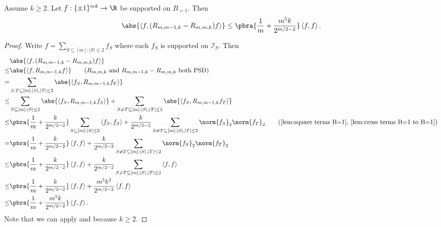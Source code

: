 \begin{corollary}\label{cor:f1-f1}
    Assume $k\geq 2$. Let $f:\{\pm1\}^{mk}\to\R$ be supported on $B_{=1}$. Then 
    \begin{align*}
        \abs{\left\langle f,(R_{m,m-1,k}-R_{m,m,k})f\right\rangle }\leq \pbra{\frac1m+\frac{m^5k}{2^{m/2-2}}}\left\langle f,f\right\rangle.
    \end{align*}
\end{corollary}
\begin{proof}
    Write $f=\sum_{S\subseteq[m]:|S|\leq 2}f_{S}$ where each $f_S$ is supported on $\mathcal{I}_S$. Then
    \begin{align*}
        & \abs{\left\langle f,(R_{m,m-1,k}-R_{m,m,k})f\right\rangle}\\
        \leq &\abs{\left\langle f,R_{m,m-1,k}f\right\rangle} \tag{$R_{m,m,k}$ and $R_{m,m-1,k}-R_{m,m,k}$ both PSD}\\
        = &\sum_{S,T\subseteq [m]:|S|,|T|\leq 2}\abs{\left\langle f_S,R_{m,m-1,k}f_T\right\rangle}\\
        \leq &\sum_{S\subseteq [m]:|S|\leq 2}\abs{\left\langle f_S,R_{m,m-1,k}f_S\right\rangle}+ \sum_{S\neq T\subseteq [m]:|S|,|T|\leq 2}\abs{\left\langle f_S,R_{m,m-1,k}f_T\right\rangle} \\
        \leq & \pbra{\frac1m+\frac{k}{2^{m/2-2}}}\sum_{S\subseteq [m]:|S|\leq 2}\left\langle f_S,f_S\right\rangle + \frac{k}{2^{m/2-2}}\sum_{S\neq T\subseteq[m]:|S|,|T|\leq 2}\norm{f_S}_2\norm{f_T}_2\tag{\Cref{lem:square terms B=1}, \Cref{lem:cross terms B=1 to B=1}}\\
        = & \pbra{\frac1m+\frac{k}{2^{m/2-2}}}\left\langle f,f\right\rangle + \frac{k}{2^{m/2-2}}\sum_{S\neq T\subseteq[m]:|S|,|T|\leq 2}\norm{f_S}_2\norm{f_T}_2 \\
        \leq & \pbra{\frac1m+\frac{k}{2^{m/2-2}}}\left\langle f,f\right\rangle + \frac{k}{2^{m/2-2}}\sum_{S\neq T\subseteq[m]:|S|,|T|\leq 2}\left\langle f,f\right\rangle\\
        \leq & \pbra{\frac1m+\frac{k}{2^{m/2-2}}}\left\langle f,f\right\rangle + \frac{m^5k^2}{2^{m/2-2}}\left\langle f,f\right\rangle\\
        \leq & \pbra{\frac1m+\frac{m^5k}{2^{m/2-2}}}\left\langle f,f\right\rangle .
    \end{align*}
    Note that we can apply  and  because $k\geq 2$.
\end{proof}
